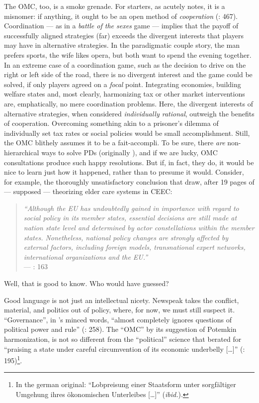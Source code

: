 The \gls{OMC}, too, is a smoke grenade. For starters, as \citeauthor{Offe2003} acutely notes, it is a misnomer: if anything, it ought to be an open method of \emph{cooperation} (\citeyear{Offe2003}: 467). Coordination --- as in a \emph{battle of the sexes} game --- implies that the payoff of successfully aligned strategies (far) exceeds the divergent interests that players may have in alternative strategies. In the paradigmatic couple story, the man prefers sports, the wife likes opera, but both want to spend the evening together. In an extreme case of a coordination game, such as the decision to drive on the right or left side of the road, there is no divergent interest and the game could be solved, if only players agreed on a \emph{focal} point. Integrating economies, building welfare states and, most clearly, harmonizing tax or other market interventions are, emphatically, no mere coordination problems. Here, the divergent interests of alternative strategies, when considered \emph{individually rational}, outweigh the benefits of cooperation. Overcoming something akin to a prisoner's dilemma of individually set tax rates or social policies would be small accomplishment. Still, the \gls{OMC} blithely assumes it to be a fait-accompli. To be sure, there \emph{are} non-hierarchical ways to solve \glspl{PD} (originally \citealt{Axelrod1980}), and if we are lucky, \gls{OMC} consultations produce such happy resolutions. But if, in fact, they do, it would be nice to learn just how it happened, rather than to presume it would.
Consider, for example, the thoroughly unsatisfactory conclusion that \citeauthor{Theobald2009} draw, after 19 pages of --- supposed --- theorizing elder care systems in \gls{CEEC}:
\begin{quote}
	\emph{``Although the \gls{EU} has undoubtedly gained in importance with regard to social policy in its member states, essential decisions are still made at nation state level and determined by actor constellations within the member states.
	Nonetheless, national policy changes are strongly affected by external factors, including foreign models, transnational expert networks, international organizations and the \gls{EU}.''}\\
	--- \citeyear{Theobald2009}: 163
\end{quote}
Well, that is good to know. Who would have guessed?

Good language is not just an intellectual nicety. Newspeak takes the conflict, material, and politics out of policy, where, for now, we must still suspect it. ``Governance'', in \citeauthor{Jachtenfuchs2001}'s minced words, ``almost completely ignores questions of political power and rule'' (\citeyear{Jachtenfuchs2001}: 258). The ``\gls{OMC}'' by its suggestion of Potemkin harmonization, is not so different from the ``political'' science that \cite{Agnoli-1989-aa} berated for ``praising a state under careful circumvention of its economic underbelly [\ldots]'' (\citeyear{Agnoli-1989-aa}: 195)\footnote{
	In the german original: ``Lobpreisung einer Staatsform unter sorgf\"{a}ltiger Umgehung ihres \"{o}konomischen Unterleibes [\ldots]'' (\emph{ibid.}).}.

